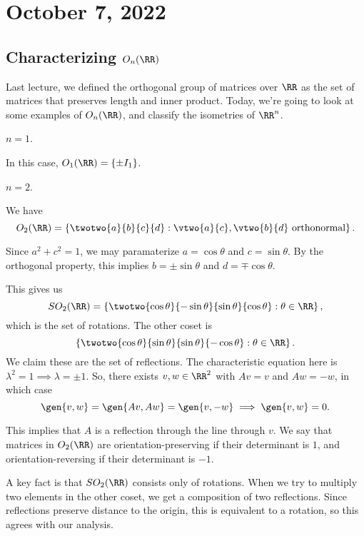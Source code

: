\section{October 7, 2022}

\subsection{Characterizing $O_n(\RR)$}

Last lecture, we defined the orthogonal group of matrices over $\RR$ as the set of matrices that preserves length and inner product. Today, we're going to look at some examples of $O_n(\RR)$, and classify the isometries of $\RR^n$. 

\begin{example}
\exlabel 

$n=1$.
\end{example}

In this case, $O_1(\RR) = \{\pm I_1\}$. 

\begin{example}
\exlabel

$n=2$. 
\end{example}

We have 
\[O_2(\RR) = \left\{\twotwo{a}{b}{c}{d} : \vtwo{a}{c}, \vtwo{b}{d}\text{ orthonormal}\right\}.\]

Since $a^2+c^2=1$, we may paramaterize $a = \cos{\theta}$ and $c = \sin{\theta}$. By the orthogonal property, this implies $b = \pm \sin{\theta}$ and $d = \mp \cos{\theta}$. 

This gives us 
\[SO_2(\RR) = \left\{\twotwo{\cos{\theta}}{-\sin{\theta}}{\sin{\theta}}{\cos{\theta}}: \theta\in \RR\right\},\]
which is the set of rotations. The other coset is
\[\left\{\twotwo{\cos{\theta}}{\sin{\theta}}{\sin{\theta}}{-\cos{\theta}}: \theta\in \RR\right\}.\]
We claim these are the set of reflections. The characteristic equation here is $\lambda^2=1\implies \lambda = \pm 1$. So, there exists $v,w\in \RR^2$ with $Av=v$ and $Aw=-w$, in which case 
\[\gen{v,w} = \gen{Av, Aw} = \gen{v,-w}\implies \gen{v,w}=0.\]

This implies that $A$ is a reflection through the line through $v$. We say that matrices in $O_2(\RR)$ are \ac{orientation-preserving} if their determinant is $1$, and \ac{orientation-reversing} if their determinant is $-1$. 

A key fact is that $SO_2(\RR)$ consists only of rotations. When we try to multiply two elements in the other coset, we get a composition of two reflections. Since reflections preserve distance to the origin, this is equivalent to a rotation, so this agrees with our analysis.

